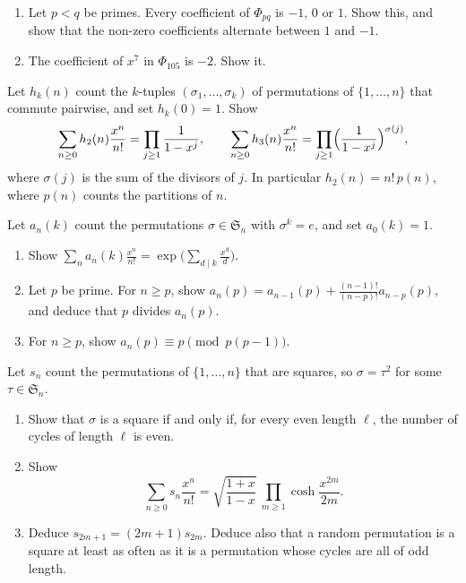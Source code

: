 \begin{exercise}[$\star\star\star$]\label{pb:phipq}
\begin{enumerate}[label=(\alph*)]
\item Let $p<q$ be primes. Every coefficient of $\Phi_{pq}$ is $-1$, $0$ or $1$. Show this, and show that the non-zero
coefficients alternate between $1$ and $-1$.
\item The coefficient of $x^7$ in $\Phi_{105}$ is $-2$. Show it.
\end{enumerate}
\end{exercise}

\begin{exercise}[$\star\star\star$]\label{pb:commuting}
Let $h_k(n)$ count the $k$-tuples $(\sigma_1,\dots,\sigma_k)$ of permutations of $\{1,\dots,n\}$ that commute pairwise,
and set $h_k(0)=1$. Show
\[
\sum_{n\ge0}h_2(n)\frac{x^n}{n!}=\prod_{j\ge1}\frac1{1-x^j},\qquad\sum_{n\ge0}h_3(n)\frac{x^n}{n!}=\prod_{j\ge1}\Bigl(\frac1{1-x^j}\Bigr)^{\sigma(j)},
\]
where $\sigma(j)$ is the sum of the divisors of $j$. In particular $h_2(n)=n!\,p(n)$, where $p(n)$ counts the partitions of $n$.
\end{exercise}

\begin{exercise}[$\star\star$]\label{pb:roots}
Let $a_n(k)$ count the permutations $\sigma\in\mathfrak S_n$ with $\sigma^k=e$, and set $a_0(k)=1$.
\begin{enumerate}[label=(\alph*)]
\item Show $\sum_na_n(k)\frac{x^n}{n!}=\exp\bigl(\sum_{d\mid k}\frac{x^d}d\bigr)$.
\item Let $p$ be prime. For $n\ge p$, show $a_n(p)=a_{n-1}(p)+\frac{(n-1)!}{(n-p)!}a_{n-p}(p)$, and deduce that $p$ divides
$a_n(p)$.
\item For $n\ge p$, show $a_n(p)\equiv p\pmod{p(p-1)}$.
\end{enumerate}
\end{exercise}

\begin{exercise}[$\star\star\star$]\label{pb:squares}
Let $s_n$ count the permutations of $\{1,\dots,n\}$ that are squares, so $\sigma=\tau^2$ for some $\tau\in\mathfrak S_n$.
\begin{enumerate}[label=(\alph*)]
\item Show that $\sigma$ is a square if and only if, for every even length $\ell$, the number of cycles of length $\ell$ is even.
\item Show
\[
\sum_{n\ge0}s_n\frac{x^n}{n!}=\sqrt{\frac{1+x}{1-x}}\ \prod_{m\ge1}\cosh\frac{x^{2m}}{2m}.
\]
\item Deduce $s_{2m+1}=(2m+1)s_{2m}$. Deduce also that a random permutation is a square at least as often as it is a permutation whose cycles
are all of odd length.
\end{enumerate}
\end{exercise}

